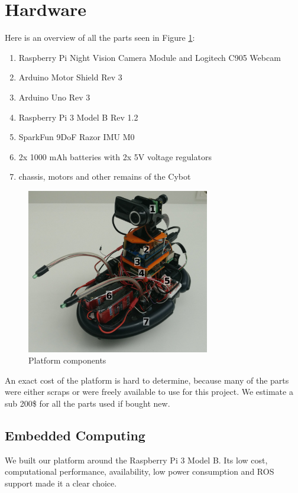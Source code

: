 \documentclass[class=article, crop=false]{standalone}
\begin{document}
\section{Hardware}\label{sec:hardware}

Here is an overview of all the parts seen in Figure \ref{fig:platform}:

\begin{enumerate}
 \item Raspberry Pi Night Vision Camera Module and Logitech C905 Webcam
 \item Arduino Motor Shield Rev 3
 \item Arduino Uno Rev 3
 \item Raspberry Pi 3 Model B Rev 1.2
 \item SparkFun 9DoF Razor IMU M0
 \item 2x 1000 mAh batteries with 2x 5V voltage regulators
 \item chassis, motors and other remains of the Cybot
\end{enumerate}

\begin{figure}
  \centering
    \includegraphics[width=8cm]{images/profile_numbered}
    \caption{Platform components}\label{fig:platform}
\end{figure}

An exact cost of the platform is hard to determine, because many of the parts were either scraps or were freely available to use for this project. We estimate a sub 200\$ for all the parts used if bought new.

\subsection{Embedded Computing}\label{subsec:soc}
We built our platform around the Raspberry Pi 3 Model B. Its low cost, computational performance, availability, low power consumption and ROS support made it a clear choice.
\end{document}
